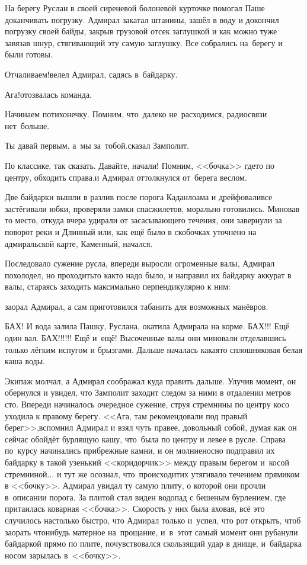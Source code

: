 На берегу Руслан в своей сиреневой болоневой курточке помогал Паше доканчивать погрузку. Адмирал закатал штанины, зашёл в воду и докончил погрузку своей байды, закрыв грузовой отсек заглушкой и как можно туже завязав шнур, стягивающий эту самую заглушку. Все собрались на~берегу и были готовы. 

\diagdash Отчаливаем!\mdash велел Адмирал, садясь в~байдарку.

\diagdash Ага!\mdash отозвалась команда.

\diagdash Начинаем потихонечку. Помним, что~далеко не~расходимся, радиосвязи нет~больше.

\diagdash Ты давай первым, а~мы за~тобой.\mdash сказал Замполит.

\diagdash По классике, так сказать. Давайте, начали! Помним, <<бочка>> где\sdash то по центру, обходить справа.\mdash и Адмирал оттолкнулся от~берега веслом.

Две байдарки вышли в разлив после порога Каданлоама и дрейфовали\mdash все застёгивали юбки, проверяли замки спасжилетов, морально готовились. Миновав то место, откуда вчера удирали от засасывающего течения, они завернули за поворот реки и Длинный или, как ещё было в скобочках уточнено на адмиральской карте, Каменный, начался.

Последовало сужение русла, впереди выросли огроменные валы, Адмирал похолодел, но проходить\sdash то как\sdash то надо было, и направил их байдарку аккурат в валы, стараясь заходить максимально перпендикулярно к ним:

\mdash заорал Адмирал, а сам приготовился табанить для возможных манёвров.

БАХ! И вода залила Пашку, Руслана, окатила Адмирала на корме. БАХ!!! Ещё один вал. БАХ!!!!!! Ещё и~ещё! Высоченные валы они миновали отделавшись только лёгким испугом и брызгами. Дальше началась какая\sdash то сплошняковая белая каша воды. 

Экипаж молчал, а Адмирал соображал куда править дальше. Улучив момент, он обернулся и увидел, что Замполит заходит следом за ними в отдалении метров сто. Впереди начиналось очередное сужение, струя стремнины по центру косо уходила к правому берегу. <<Ага, там рекомендовали под правый берег>>,\mdash вспомнил Адмирал и взял чуть правее, довольный собой, думая как он сейчас обойдёт бурлящую кашу, что~была по центру и левее в русле. Справа по~курсу начинались прибрежные камни, и он молниеносно подправил их байдарку в такой узенький <<коридорчик>> между правым берегом и~косой стремниной$\ldots$ и тут же осознал, что~происходит\mdash их утягивало течением прямиком в <<бочку>>. Адмирал увидал ту самую плиту, о которой они прочли в~описании порога. За плитой стал виден водопад с бешеным бурлением, где притаилась коварная <<бочка>>. Скорость у них была аховая, всё это случилось настолько быстро, что Адмирал только и~успел, что рот открыть, чтоб заорать что\sdash нибудь матерное на~прощание, и~в~этот самый момент они рубанули байдаркой прямо по плите, почувствовался скользящий удар в днище, и~байдарка носом зарылась в~<<бочку>>.

